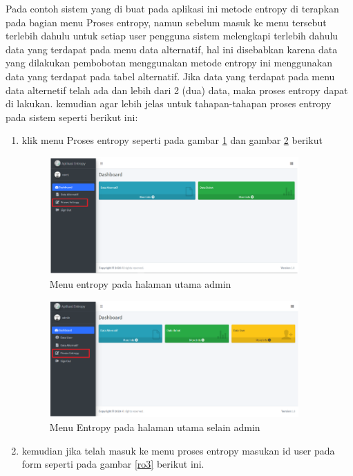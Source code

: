  Pada contoh sistem yang di buat pada aplikasi ini metode entropy di terapkan pada bagian menu Proses entropy, namun sebelum masuk ke menu tersebut terlebih dahulu untuk setiap user pengguna sistem melengkapi terlebih dahulu data yang terdapat pada menu data alternatif, hal ini disebabkan karena data yang dilakukan pembobotan menggunakan metode entropy ini menggunakan data yang terdapat pada tabel alternatif. Jika data yang terdapat pada menu data alternetif telah ada dan lebih dari 2 (dua) data, maka proses entropy dapat di lakukan. kemudian agar lebih jelas untuk tahapan-tahapan proses entropy pada sistem seperti berikut ini:
\pagebreak
\begin{enumerate}
\item klik menu Proses entropy seperti pada gambar \ref{ro1} dan gambar \ref{ro2} berikut 

\begin{figure}[h]
	\centerline{\includegraphics[width=0.9\textwidth]{figures/pje/1.png}}
	\caption{Menu entropy pada halaman utama admin}
	\label{ro1}
\end{figure}

\begin{figure}[h]
	\centerline{\includegraphics[width=0.9\textwidth]{figures/pje/2.png}}
	\caption{Menu Entropy pada halaman utama selain admin}
	\label{ro2}
\end{figure}
\pagebreak
\item kemudian jika telah masuk ke menu proses entropy masukan id user pada form seperti pada gambar \ref{ro3} berikut ini.


\end{enumerate}
